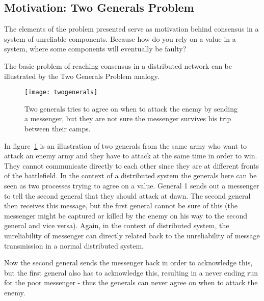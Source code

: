 

\subsection{Motivation: Two Generals Problem} %
\label{sub:motivation_two_generals_problem}

The elements of the problem presented serve as motivation behind consensus in a system of unreliable components. Because how do you rely on a value in a system, where some components will eventually be faulty?

The basic problem of reaching consensus in a distributed network can be illustrated by the Two Generals Problem analogy.

\begin{figure}[h]
	\centering
	\texttt{[image: twogenerals]}
	\caption{Two generals tries to agree on when to attack the enemy by sending a messenger, but they are not sure the messenger survives his trip between their camps.}
	\label{generals}
\end{figure}

In figure~\ref{generals} is an illustration of two generals from the same army who want to attack an enemy army and they have to attack at the same time in order to win. They cannot communicate directly to each other since they are at different fronts of the battlefield. In the context of a distributed system the generals here can be seen as two processes trying to agree on a value.
General 1 sends out a messenger to tell the second general that they should attack at dawn. The second general then receives this message, but the first general cannot be sure of this (the messenger might be captured or killed by the enemy on his way to the second general and vice versa). Again, in the context of distributed system, the unreliability of messenger can directly related back to the unreliability of message transmission in a normal distributed system.

Now the second general sends the messenger back in order to acknowledge this, but the first general also has to acknowledge this, resulting in a never ending run for the poor messenger - thus the generals can never agree on when to attack the enemy.

